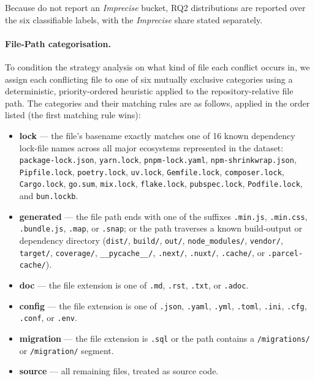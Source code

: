 \documentclass[sigconf,anonymous]{acmart}
\begin{document}
Because \citet{ghiotto2020nature} do not report an \textit{Imprecise} bucket, RQ2 distributions are reported over the six classifiable labels, with the \textit{Imprecise} share stated separately.

\paragraph{File-Path categorisation.}
\label{sec:meth-filecats}
To condition the strategy analysis on what kind of file each conflict occurs in, we assign each conflicting file to one of six mutually exclusive categories using a deterministic, priority-ordered heuristic applied to the repository-relative file path. The categories and their matching rules are as follows, applied in the order listed (the first matching rule wins):

\begin{itemize}
    \item \textbf{lock} --- the file's basename exactly matches one of 16 known dependency lock-file names across all major ecosystems represented in the dataset: \texttt{package-lock.json}, \texttt{yarn.lock}, \texttt{pnpm-lock.yaml}, \texttt{npm-shrinkwrap.json}, \texttt{Pipfile.lock}, \linebreak \texttt{poetry.lock}, \texttt{uv.lock}, \texttt{Gemfile.lock}, \texttt{composer.lock}, \linebreak \texttt{Cargo.lock}, \texttt{go.sum}, \texttt{mix.lock}, \texttt{flake.lock}, \linebreak \texttt{pubspec.lock}, \texttt{Podfile.lock}, and \texttt{bun.lockb}.
    \item \textbf{generated} --- the file path ends with one of the suffixes \texttt{.min.js}, \texttt{.min.css}, \texttt{.bundle.js}, \texttt{.map}, or \texttt{.snap}; or the path traverses a known build-output or dependency directory (\texttt{dist/}, \texttt{build/}, \texttt{out/}, \texttt{node\_modules/}, \texttt{vendor/}, \linebreak \texttt{target/}, \texttt{coverage/}, \texttt{\_\_pycache\_\_/}, \texttt{.next/}, \texttt{.nuxt/}, \linebreak \texttt{.cache/}, or \texttt{.parcel-cache/}).
    \item \textbf{doc} --- the file extension is one of \texttt{.md}, \texttt{.rst}, \texttt{.txt}, or \texttt{.adoc}.
    \item \textbf{config} --- the file extension is one of \texttt{.json}, \texttt{.yaml}, \texttt{.yml}, \texttt{.toml}, \texttt{.ini}, \texttt{.cfg}, \texttt{.conf}, or \texttt{.env}.
    \item \textbf{migration} --- the file extension is \texttt{.sql} or the path contains a \texttt{/migrations/} or \texttt{/migration/} segment.
    \item \textbf{source} --- all remaining files, treated as source code.
\end{itemize}
\end{document}
